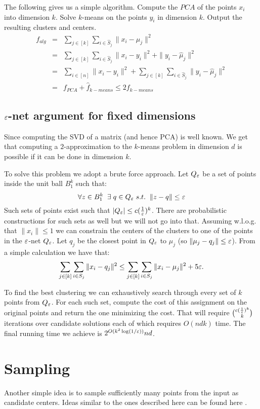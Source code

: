 \documentclass{article}
\begin{document}
The following gives us a simple algorithm. Compute the $PCA$ of the points $x_i$ into dimension $k$.
Solve $k$-means on the points $y_i$ in dimension $k$. Output the resulting clusters and centers.
\begin{eqnarray}
f_{alg} &=& \sum_{j \in [k]} \sum_{i \in \hat{S}_j} \|x_i -\hat{\mu}_j \|^2 \\
&=& \sum_{j \in [k]} \sum_{i \in \hat{S}_j} \|x_i -y_i \|^2 + \|y_i - \hat{\mu}_j\|^2 \\
&= & \sum_{i \in [n]} \|x_i -y_i \|^2 + \sum_{j \in [k]} \sum_{i \in \hat{S}_j}\|y_i - \hat{\mu}_j\|^2 \\
&=& f_{PCA} + \hat{f}_{k-means} \le 2f_{k-means}
\end{eqnarray}

\subsection{$\varepsilon$-net argument for fixed dimensions}
Since computing the SVD of a matrix (and hence PCA) is well known. 
We get that computing a $2$-approximation to 
the $k$-means problem in dimension $d$ is possible if it can be done in dimension $k$.

To solve this problem we adopt a brute force approach.
Let $Q_{\varepsilon}$ be a set of points inside the unit ball $B^{k}_{1}$ such that:
\[
\forall z \in B^{k}_{1} \;\; \exists \; q \in Q_{\varepsilon} \; s.t. \;\; \|z - q\| \le \varepsilon
\]
Such sets of points exist such that  $|Q_{\varepsilon}| \le c(\frac{1}{\varepsilon})^k$. There are 
probabilistic constructions for such sets as well but we will not go into that.
Assuming w.l.o.g. that $\|x_i\| \le 1$ we can constrain the centers of 
the clusters to one of the points in the $\varepsilon$-net $Q_{\varepsilon}$.
Let $q_j$ be the closest point in $Q_{\varepsilon}$ to $\mu_j$ (so $\|\mu_j - q_j \| \le \varepsilon$).
From a simple calculation we have that:
\[
\sum_{j \in [k]} \sum_{i \in S_j} \|x_i - q_j \|^2 \le  \sum_{j \in [k]} \sum_{i \in S_j} \|x_i - \mu_j \|^2 + 5\varepsilon.
\]
 
To find the best clustering we can exhaustively search through every set of $k$ points from $Q_{\varepsilon}$.
For each such set, compute the cost of this assignment on the original points and return the one minimizing the cost.
That will require ${c(\frac{1}{\varepsilon})^k \choose k}$ iterations over candidate solutions each of which requires $O(ndk)$ time. 
The final running time we achieve is $2^{O(k^2\log(1/\varepsilon))}nd$. 


\section{Sampling}
Another simple idea is to sample sufficiently many points from the input as candidate centers.
Ideas similar to the ones described here can be found here \cite{ZhaHDGS01}.
\end{document}
